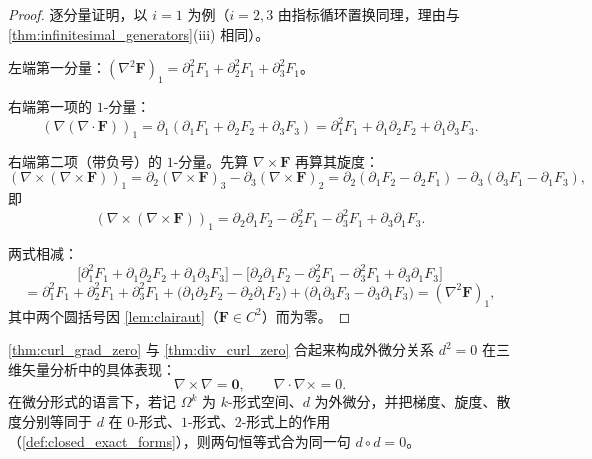 \begin{proof}
逐分量证明，以 $i=1$ 为例（$i=2,3$ 由指标循环置换同理，理由与 \cref{thm:infinitesimal_generators}(iii) 相同）。

左端第一分量：$(\nabla^2\mathbf F)_1 = \partial_1^2F_1+\partial_2^2F_1+\partial_3^2F_1$。

右端第一项的 $1$-分量：
\[
(\nabla(\nabla\cdot\mathbf F))_1 = \partial_1(\partial_1F_1+\partial_2F_2+\partial_3F_3) = \partial_1^2F_1+\partial_1\partial_2F_2+\partial_1\partial_3F_3 .
\]

右端第二项（带负号）的 $1$-分量。先算 $\nabla\times\mathbf F$ 再算其旋度：
\[
(\nabla\times(\nabla\times\mathbf F))_1
= \partial_2(\nabla\times\mathbf F)_3-\partial_3(\nabla\times\mathbf F)_2
= \partial_2(\partial_1F_2-\partial_2F_1)-\partial_3(\partial_3F_1-\partial_1F_3),
\]
即
\[
(\nabla\times(\nabla\times\mathbf F))_1 = \partial_2\partial_1F_2-\partial_2^2F_1-\partial_3^2F_1+\partial_3\partial_1F_3 .
\]

两式相减：
\[
\bigl[\partial_1^2F_1+\partial_1\partial_2F_2+\partial_1\partial_3F_3\bigr]
-\bigl[\partial_2\partial_1F_2-\partial_2^2F_1-\partial_3^2F_1+\partial_3\partial_1F_3\bigr]
\]
\[
= \partial_1^2F_1+\partial_2^2F_1+\partial_3^2F_1
+\bigl(\partial_1\partial_2F_2-\partial_2\partial_1F_2\bigr)
+\bigl(\partial_1\partial_3F_3-\partial_3\partial_1F_3\bigr)
= (\nabla^2\mathbf F)_1,
\]
其中两个圆括号因 \cref{lem:clairaut}（$\mathbf F\in C^2$）而为零。
\end{proof}

\begin{corollary}[$d^2 = 0$ 的矢量分析表述]\label{cor:d2_zero}
\cref{thm:curl_grad_zero} 与 \cref{thm:div_curl_zero} 合起来构成外微分关系 $d^2=0$ 在三维矢量分析中的具体表现：
\[
\nabla \times \nabla = \mathbf{0}, \qquad \nabla \cdot \nabla \times = 0 .
\]
在微分形式的语言下，若记 $\Omega^k$ 为 $k$-形式空间、$d$ 为外微分，并把梯度、旋度、散度分别等同于 $d$ 在 $0$-形式、$1$-形式、$2$-形式上的作用（\cref{def:closed_exact_forms}），则两句恒等式合为同一句 $d\circ d=0$。
\end{corollary}

